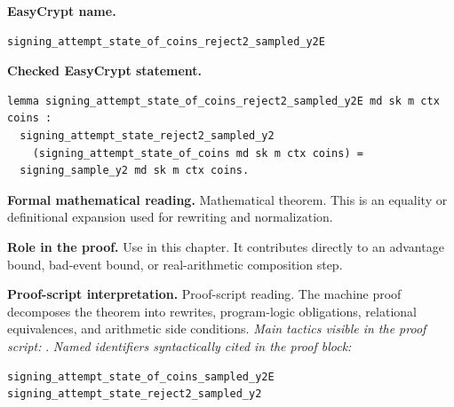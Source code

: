 \begin{formaltheorem}
\noindent\textbf{EasyCrypt name.}
\begin{lstlisting}[language=EasyCrypt,basicstyle=\ttfamily\scriptsize]
signing_attempt_state_of_coins_reject2_sampled_y2E
\end{lstlisting}
\noindent\textbf{Checked EasyCrypt statement.}
\begin{lstlisting}[language=EasyCrypt,basicstyle=\ttfamily\scriptsize]
lemma signing_attempt_state_of_coins_reject2_sampled_y2E md sk m ctx coins :
  signing_attempt_state_reject2_sampled_y2
    (signing_attempt_state_of_coins md sk m ctx coins) =
  signing_sample_y2 md sk m ctx coins.
\end{lstlisting}
\noindent\textbf{Formal mathematical reading.}
Mathematical theorem. This is an equality or definitional expansion used for rewriting and normalization.

\noindent\textbf{Role in the proof.}
Use in this chapter. It contributes directly to an advantage bound, bad-event bound, or real-arithmetic composition step.

\noindent\textbf{Proof-script interpretation.}
Proof-script reading. The machine proof decomposes the theorem into rewrites, program-logic obligations, relational equivalences, and arithmetic side conditions.
\emph{Main tactics visible in the proof script:} .
\emph{Named identifiers syntactically cited in the proof block:}
\begin{lstlisting}[language=EasyCrypt,basicstyle=\ttfamily\scriptsize]
signing_attempt_state_of_coins_sampled_y2E
signing_attempt_state_reject2_sampled_y2
\end{lstlisting}

\end{formaltheorem}

